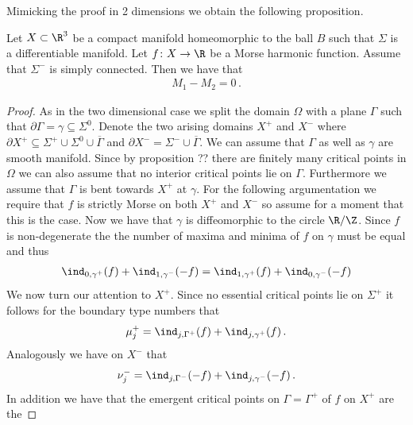 Mimicking the proof in 2 dimensions we obtain the following proposition.
\begin{proposition}
  Let $X\subset\R^3$ be a compact manifold homeomorphic to the ball $B$ such that $\Sigma$ is a differentiable manifold.
  Let $f\colon X\to\R$ be a Morse harmonic function. Assume that $\Sigma^-$ is simply connected.
  Then we have that
  \begin{align*}
    M_1-M_2=0\,.
  \end{align*}
\end{proposition}
\begin{proof}
  As in the two dimensional case we split the domain $\Omega$ with a plane $\Gamma$ such that
  $\partial\Gamma=\gamma\subseteq\Sigma^0$.
  Denote the two arising domains $X^+$ and $X^-$ where $\partial X^+\subseteq\Sigma^+\cup\Sigma^0\cup\overline{\Gamma}$ and
  $\partial X^-=\Sigma^-\cup\overline{\Gamma}$.
  We can assume that $\Gamma$ as well as $\gamma$ are smooth manifold.
  Since by proposition ?? there are finitely many critical points in $\Omega$
  we can also assume that no interior critical points lie on $\Gamma$.
  Furthermore we assume that $\Gamma$ is bent towards $X^+$ at $\gamma$.
  For the following argumentation we require that $f$ is strictly Morse on both $X^+$ and
  $X^-$ so assume for a moment that this is the case.
  Now we have that $\gamma$ is diffeomorphic to the circle $\R/\Z$.
  Since $f$ is non-degenerate the
  the number of maxima and minima of $f$ on $\gamma$ must be equal and thus
  \begin{align}
    \ind_{0,\gamma^+}(f)+\ind_{1,\gamma^-}(-f)=\ind_{1,\gamma^+}(f)+\ind_{0,\gamma^-}(-f)
    \label{eq:n3_disproof_morse_maxMinRel}
  \end{align}
  We now turn our attention to $X^+$. Since no essential critical points lie on $\Sigma^+$ 
  it follows for the boundary type numbers that
  \begin{align}
    \mu^+_j=\ind_{j,\Gamma^+}(f)+\ind_{j,\gamma^+}(f)\,.\label{eq:n3_disproof_morse_muplus}
  \end{align}
  Analogously we have on $X^-$ that
  \begin{align}
    \nu^-_j=\ind_{j,\Gamma^-}(-f)+\ind_{j,\gamma^-}(-f)\,.\label{eq:n3_disproof_morse_numinus}
  \end{align}
  In addition we have that the emergent critical points on $\Gamma=\Gamma^+$ of $f$ on $X^+$ are the

\end{proof}
